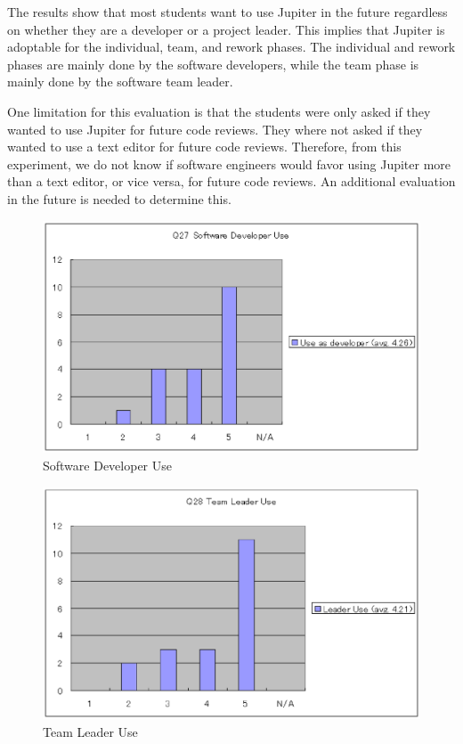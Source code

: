 The results show that most students want to use Jupiter in the future regardless on whether they are a developer or a project leader. This implies that Jupiter is adoptable for the individual, team, and rework phases. The individual and rework phases are mainly done by the software developers, while the team phase is mainly done by the software team leader.

One limitation for this evaluation is that the students were only asked if they wanted to use Jupiter for future code reviews. They where not asked if they wanted to use a text editor for future code reviews. Therefore, from this experiment, we do not know if software engineers would favor using Jupiter more than a text editor, or vice versa, for future code reviews. An additional evaluation in the future is needed to determine this.
 
\begin{figure}[htbp]
  \centering
  \includegraphics{images/fig5-17.eps}
  \caption{Software Developer Use}
  \label{fig5-17}
\end{figure}

\begin{figure}[htbp]
  \centering
  \includegraphics{images/fig5-18.eps}
  \caption{Team Leader Use}
  \label{fig5-18}
\end{figure}

